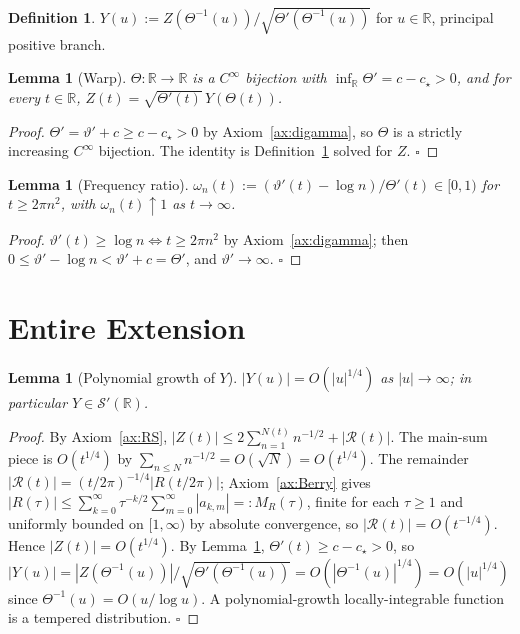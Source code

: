 \documentclass[11pt]{article}
\newtheorem{lemma}[theorem]{Lemma}
\theoremstyle{definition}
\newtheorem{definition}[theorem]{Definition}
\newcommand{\R}{\mathbb{R}}
\begin{document}
\begin{definition}\label{def:Y}
\(Y(u):=Z(\Theta^{-1}(u))/\sqrt{\Theta'(\Theta^{-1}(u))}\) for \(u\in\R\), principal positive branch.
\end{definition}

\begin{lemma}[Warp]\label{lem:warp}
\(\Theta:\R\to\R\) is a \(C^\infty\) bijection with \(\inf_\R\Theta'=c-c_\star>0\), and for every \(t\in\R\), \(Z(t)=\sqrt{\Theta'(t)}\,Y(\Theta(t))\).
\end{lemma}

\begin{proof}
\(\Theta'=\vartheta'+c\ge c-c_\star>0\) by Axiom~\ref{ax:digamma}, so \(\Theta\) is a strictly increasing \(C^\infty\) bijection. The identity is Definition~\ref{def:Y} solved for \(Z\). \(\square\)
\end{proof}

\begin{lemma}[Frequency ratio]\label{lem:freq}
\(\omega_n(t):=(\vartheta'(t)-\log n)/\Theta'(t)\in[0,1)\) for \(t\ge 2\pi n^2\), with \(\omega_n(t)\uparrow 1\) as \(t\to\infty\).
\end{lemma}

\begin{proof}
\(\vartheta'(t)\ge\log n\iff t\ge 2\pi n^2\) by Axiom~\ref{ax:digamma}; then \(0\le\vartheta'-\log n<\vartheta'+c=\Theta'\), and \(\vartheta'\to\infty\). \(\square\)
\end{proof}

\section{Entire Extension}

\begin{lemma}[Polynomial growth of \(Y\)]\label{lem:polygrowth}
\(|Y(u)|=O(|u|^{1/4})\) as \(|u|\to\infty\); in particular \(Y\in\mathcal S'(\R)\).
\end{lemma}

\begin{proof}
By Axiom~\ref{ax:RS}, \(|Z(t)|\le 2\sum_{n=1}^{N(t)}n^{-1/2}+|\mathcal R(t)|\). The main-sum piece is \(O(t^{1/4})\) by \(\sum_{n\le N}n^{-1/2}=O(\sqrt N)=O(t^{1/4})\). The remainder \(|\mathcal R(t)|=(t/2\pi)^{-1/4}|R(t/2\pi)|\); Axiom~\ref{ax:Berry} gives \(|R(\tau)|\le\sum_{k=0}^\infty\tau^{-k/2}\sum_{m=0}^\infty|a_{k,m}|=:M_R(\tau)\), finite for each \(\tau\ge 1\) and uniformly bounded on \([1,\infty)\) by absolute convergence, so \(|\mathcal R(t)|=O(t^{-1/4})\). Hence \(|Z(t)|=O(t^{1/4})\). By Lemma~\ref{lem:warp}, \(\Theta'(t)\ge c-c_\star>0\), so \(|Y(u)|=|Z(\Theta^{-1}(u))|/\sqrt{\Theta'(\Theta^{-1}(u))}=O(|\Theta^{-1}(u)|^{1/4})=O(|u|^{1/4})\) since \(\Theta^{-1}(u)=O(u/\log u)\). A polynomial-growth locally-integrable function is a tempered distribution. \(\square\)
\end{proof}
\end{document}
